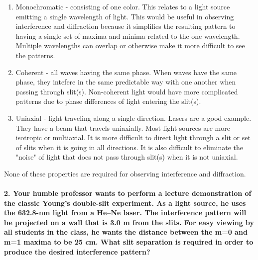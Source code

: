 \documentclass[11pt]{article}
\providecommand{\tightlist}{%
      \setlength{\itemsep}{0pt}\setlength{\parskip}{0pt}}
\begin{document}
\begin{enumerate}
\def\labelenumi{\alph{enumi}.}
\tightlist
\item
  Monochromatic - consisting of one color. This relates to a light
  source emitting a single wavelength of light. This would be useful in
  observing interference and diffraction because it simplifies the
  resulting pattern to having a single set of maxima and minima related
  to the one wavelength. Multiple wavelengths can overlap or otherwise
  make it more difficult to see the patterns.
\item
  Coherent - all waves having the same phase. When waves have the same
  phase, they intefere in the same predictable way with one another when
  passing through slit(s). Non-coherent light would have more
  complicated patterns due to phase differences of light entering the
  slit(s).
\item
  Uniaxial - light traveling along a single direction. Lasers are a good
  example. They have a beam that travels uniaxially. Most light sources
  are more isotropic or multiaxial. It is more difficult to direct light
  through a slit or set of slits when it is going in all directions. It
  is also difficult to eliminate the "noise" of light that does not pass
  through slit(s) when it is not uniaxial.
\end{enumerate}

None of these properties are required for observing interference and
diffraction.

\paragraph{2. Your humble professor wants to perform a lecture
demonstration of the classic Young's double-slit experiment. As a light
source, he uses the 632.8-nm light from a He--Ne laser. The interference
pattern will be projected on a wall that is 3.0 m from the slits. For
easy viewing by all students in the class, he wants the distance between
the m=0 and m=1 maxima to be 25 cm. What slit separation is required in
order to produce the desired interference
pattern?}\label{your-humble-professor-wants-to-perform-a-lecture-demonstration-of-the-classic-youngs-double-slit-experiment.-as-a-light-source-he-uses-the-632.8-nm-light-from-a-hene-laser.-the-interference-pattern-will-be-projected-on-a-wall-that-is-3.0-m-from-the-slits.-for-easy-viewing-by-all-students-in-the-class-he-wants-the-distance-between-the-m0-and-m1-maxima-to-be-25-cm.-what-slit-separation-is-required-in-order-to-produce-the-desired-interference-pattern}
\end{document}
